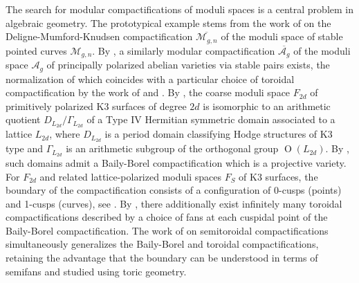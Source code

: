 \documentclass{amsart}
\begin{document}
\begin{remark}

The search for modular compactifications of moduli spaces is a central problem in algebraic geometry. The prototypical example stems from the work of \cite{deligne1969the-irreducibility-of-the-space, knudsen1976the-projectivity-of-the-moduli,knudsen1983the-projectivity-of-the-moduli23} on the Deligne-Mumford-Knudsen compactification \(\overline{{ \mathcal{M}_{g, n} }}\) of the moduli space of stable pointed curves \({ \mathcal{M}_{g, n} }\). By \cite{mumford1965git, namikawa1976a-new-compactification-of-the-siegel1, alexeev1999on-mumfords-construction, alexeev2002complete-moduli}, a similarly modular compactification \(\overline{{\mathcal{A}_g}}\) of the moduli space \({\mathcal{A}_g}\) of principally polarized abelian varieties via stable pairs exists, the normalization of which coincides with a particular choice of toroidal \cite{AMRT75} compactification by the work of \cite{kollar1988threefolds-and-deformations} and \cite{alexeev1996moduli-spaces}. By \cite{PSS71}, the coarse moduli space \(F_{2d}\) of primitively polarized K3 surfaces of degree \(2d\) is isomorphic to an arithmetic quotient \(D_{L_{2d}}/\Gamma_{L_{2d}}\) of a Type IV Hermitian symmetric domain associated to a lattice \(L_{2d}\), where \(D_{L_{2d}}\) is a period domain classifying Hodge structures of K3 type and \(\Gamma_{L_{2d}}\) is an arithmetic subgroup of the orthogonal group \({\operatorname{O}}(L_{2d})\). By \cite{BB66}, such domains admit a Baily-Borel compactification which is a projective variety. For \(F_{2d}\) and related lattice-polarized moduli spaces \(F_S\) of K3 surfaces, the boundary of the compactification consists of a configuration of 0-cusps (points) and 1-cusps (curves), see \cite{scattone1987on-the-compactification-of-moduli}. By \cite{AMRT75}, there additionally exist infinitely many toroidal compactifications described by a choice of fans at each cuspidal point of the Baily-Borel compactification. The work of \cite{looijenga1985semi-toric} on semitoroidal compactifications simultaneously generalizes the Baily-Borel and toroidal compactifications, retaining the advantage that the boundary can be understood in terms of semifans and studied using toric geometry.


\end{remark}
\end{document}

